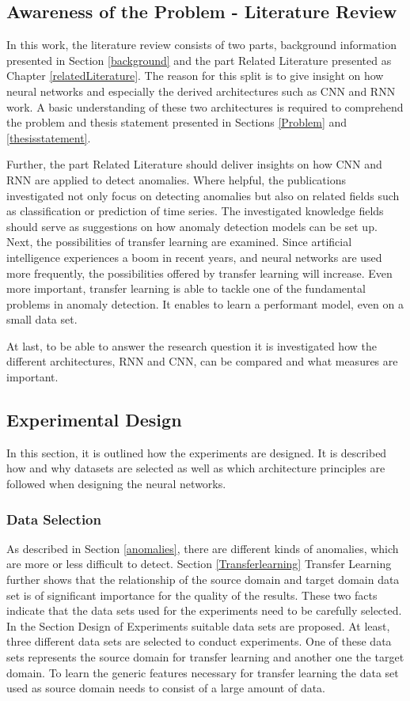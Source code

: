 \newpage
\subsection{Awareness of the Problem - Literature Review}
In this work, the literature review consists of two parts, background information presented in Section \ref{background} and the part Related Literature presented as Chapter \ref{relatedLiterature}. The reason for this split is to give insight on how neural networks and especially the derived architectures such as CNN and RNN work. A basic understanding of these two architectures is required to comprehend the problem and thesis statement presented in Sections \ref{Problem} and \ref{thesisstatement}. 

Further, the part Related Literature should deliver insights on how CNN and RNN are applied to detect anomalies. Where helpful, the publications investigated not only focus on detecting anomalies but also on related fields such as classification or prediction of time series. The investigated knowledge fields should serve as suggestions on how anomaly detection models can be set up. Next, the possibilities of transfer learning are examined. Since artificial intelligence experiences a boom in recent years, and neural networks are used more frequently, the possibilities offered by transfer learning will increase. Even more important, transfer learning is able to tackle one of the fundamental problems in anomaly detection. It enables to learn a performant model, even on a small data set. 

At last, to be able to answer the research question it is investigated how the different architectures, RNN and CNN, can be compared and what measures are important. 

\subsection{Experimental Design}
In this section, it is outlined how the experiments are designed. It is described how and why datasets are selected as well as which architecture principles are followed when designing the neural networks.

\subsubsection{Data Selection}
As described in Section \ref{anomalies}, there are different kinds of anomalies, which are more or less difficult to detect. Section \ref{Transferlearning} Transfer Learning further shows that the relationship of the source domain and target domain data set is of significant importance for the quality of the results. These two facts indicate that the data sets used for the experiments need to be carefully selected. In the Section Design of Experiments suitable data sets are proposed. At least, three different data sets are selected to conduct experiments. One of these data sets represents the source domain for transfer learning and another one the target domain. To learn the generic features necessary for transfer learning the data set used as source domain needs to consist of a large amount of data.

